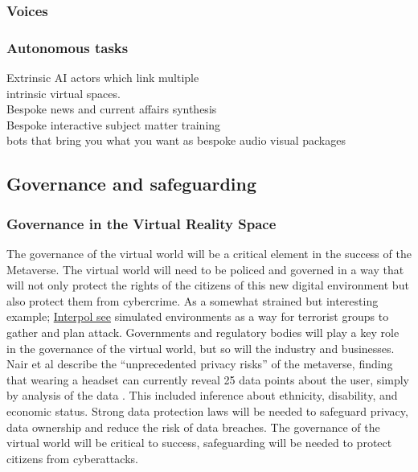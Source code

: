 \subsubsection{Voices}
\subsubsection{Autonomous tasks}

Extrinsic AI actors which link multiple\\ intrinsic virtual spaces.\\
Bespoke news and current affairs synthesis\\
Bespoke interactive subject matter training\\
bots that bring you what you want as bespoke audio visual packages
\subsection{Governance and safeguarding}
\subsubsection{Governance in the Virtual Reality Space}
The governance of the virtual world will be a critical element in the success of the Metaverse. The virtual world will need to be policed and governed in a way that will not only protect the rights of the citizens of this new digital environment but also protect them from cybercrime. As a somewhat strained but interesting example; \href{https://www.reuters.com/technology/interpol-says-metaverse-opens-up-new-world-cybercrime-2022-10-27/}{Interpol see} simulated environments as a way for terrorist groups to gather and plan attack. Governments and regulatory bodies will play a key role in the governance of the virtual world, but so will the industry and businesses. Nair et al describe the ``unprecedented privacy risks'' of the metaverse, finding that wearing a headset can currently reveal 25 data points about the user, simply by analysis of the data \cite{nair2022exploring, Nair2023}.  This included inference about ethnicity, disability, and economic status. Strong data protection laws will be needed to safeguard privacy, data ownership and reduce the risk of data breaches. The governance of the virtual world will be critical to success, safeguarding will be needed to protect citizens from cyberattacks.
